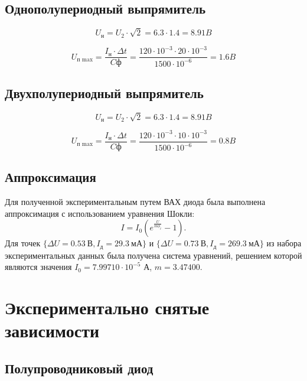 \subsection{Однополупериодный выпрямитель}

\begin{displaymath}
U_\text{н} = U_2 \cdot \sqrt{2} = 6.3 \cdot 1.4 = 8.91 B
\end{displaymath}

\begin{displaymath}
U_\text{п max} = \frac{I_\text{н} \cdot \Delta t}{C\text{ф}} = \frac{120 \cdot 10^{-3}\cdot 20 \cdot 10^{-3}}{1500 \cdot 10^{-6}} = 1.6 B
\end{displaymath}

\subsection{Двухполупериодный выпрямитель}

\begin{displaymath}
U_\text{н} = U_2 \cdot \sqrt{2} = 6.3 \cdot 1.4 = 8.91 B
\end{displaymath}

\begin{displaymath}
U_\text{п max} = \frac{I_\text{н} \cdot \Delta t}{C\text{ф}} = \frac{120 \cdot 10^{-3}\cdot 10 \cdot 10^{-3}}{1500 \cdot 10^{-6}} = 0.8 B
\end{displaymath}

\subsection{Аппроксимация}

Для полученной экспериментальным путем ВАХ диода была выполнена аппроксимация с использованием уравнения Шокли:
\begin{equation}
I = I_0 (e^{\frac{U}{m \phi_t}} - 1).
\end{equation}
Для точек 
$\{\Delta U=0.53\ \text{В}, I_\text{д}=29.3\ \text{мА}\}$ 
и 
$\{\Delta U=0.73\ \text{В}, I_\text{д}=269.3\ \text{мА}\}$ 
из набора экспериментальных данных была получена система уравнений, решением которой являются значения 
$I_0 = 7.99710 \cdot 10^{-5}$ А, $m =  3.47400$.


\section{Экспериментально снятые зависимости}

\subsection{Полупроводниковый диод}

